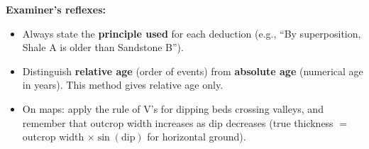 \documentclass[11pt]{article}
\newcommand{\cle}[1]{{\popxbold\color{popdark}#1}}
\begin{document}
\begin{methode}
\textbf{Examiner's reflexes:}
\begin{itemize}
    \item Always state the \textbf{principle used} for each deduction (e.g., ``By superposition, Shale A is older than Sandstone B'').
    \item Distinguish \textbf{relative age} (order of events) from \textbf{absolute age} (numerical age in years). This method gives relative age only.
    \item On maps: apply the \cle{rule of V's} for dipping beds crossing valleys, and remember that outcrop width increases as dip decreases (true thickness $=$ outcrop width $\times \sin(\text{dip})$ for horizontal ground).
\end{itemize}
\end{methode}
\end{document}
